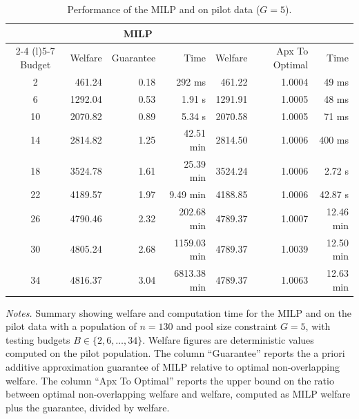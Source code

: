 \begin{table}[tb!]
    \centering
    \begin{threeparttable}
    \caption{Performance of the MILP and \greedy{} on pilot data ($G=5$).}
    \label{table:experiment1}
    {\small
    \renewcommand{\arraystretch}{1.15}
    \begin{tabular}{@{} crrrrrr @{}}
        \toprule
        & \multicolumn{3}{c}{{MILP}} & \multicolumn{3}{c}{{\greedy{}}} \\
        \cmidrule(lr){2-4} \cmidrule(l){5-7}
        {Budget} & Welfare & Guarantee & Time & Welfare & Apx To Optimal & Time \\
        \midrule
        2 & 461.24 & 0.18 & 292 ms & 461.22 & 1.0004 & 49 ms \\
        6 & 1292.04 & 0.53 & 1.91 s & 1291.91 & 1.0005 & 48 ms \\
        10 & 2070.82 & 0.89 & 5.34 s & 2070.58 & 1.0005 & 71 ms \\
        14 & 2814.82 & 1.25 & 42.51 min & 2814.50 & 1.0006 & 400 ms \\
        18 & 3524.78 & 1.61 & 25.39 min & 3524.24 & 1.0006 & 2.72 s \\
        22 & 4189.57 & 1.97 & 9.49 min & 4188.85 & 1.0006 & 42.87 s \\
        26 & 4790.46 & 2.32 & 202.68 min & 4789.37 & 1.0007 & 12.46 min \\
        30 & 4805.24 & 2.68 & 1159.03 min & 4789.37 & 1.0039 & 12.50 min \\
        34 & 4816.37 & 3.04 & 6813.38 min & 4789.37 & 1.0063 & 12.63 min \\
        \bottomrule
    \end{tabular}
    }
    \begin{tablenotes}[flushleft]
    \footnotesize
    \item[] \emph{Notes.} Summary showing welfare and computation time for the MILP and \greedy{} on the pilot data with a population of $n=130$ and pool size constraint $G=5$, with testing budgets $B \in \{2, 6, \ldots, 34\}$. Welfare figures are deterministic values computed on the pilot population. The column ``Guarantee'' reports the a priori additive approximation guarantee of MILP relative to optimal non-overlapping welfare. The column ``Apx To Optimal'' reports the upper bound on the ratio between optimal non-overlapping welfare and \greedy{} welfare, computed as MILP welfare plus the guarantee, divided by \greedy{} welfare.
    \end{tablenotes}
    \end{threeparttable}
\end{table}
